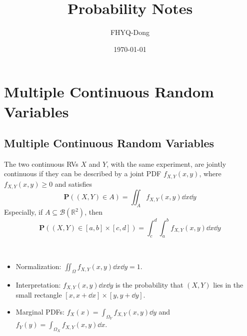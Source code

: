 \documentclass[device=normal, lang=en]{elegantbook}
\title{Probability Notes}
\author{FHYQ-Dong}
\date{\today}
\numberwithin{equation}{section}
\begin{document}
\maketitle
\frontmatter

\tableofcontents
\mainmatter











\chapter{Multiple Continuous Random Variables}


\section{Multiple Continuous Random Variables}

\begin{definition}
    The two continuous RVs $X$ and $Y$, with the same experiment, are jointly continuous if they can be described by a joint PDF $f_{X, Y}(x, y)$, where $f_{X, Y}(x, y) \geq 0$ and satisfies
    \begin{equation}
        \mathbf{P}((X, Y) \in A) = \iint_{A} f_{X, Y}(x, y) \dd{x} \dd{y}
    \end{equation}
    Especially, if $A \subseteq \mathcal{B}(\mathbb{R}^2)$, then
    \begin{equation}
        \mathbf{P}((X, Y) \in [a, b] \times [c, d]) = \int_{c}^{d} \int_{a}^{b} f_{X, Y}(x, y) \dd{x} \dd{y}
    \end{equation}
\end{definition}

\begin{property} ~
    \begin{itemize}
        \item Normalization: $\iint_{\Omega} f_{X, Y}(x, y) \dd{x} \dd{y} = 1$.
        \item Interpretation: $f_{X, Y}(x, y) \dd{x} \dd{y}$ is the probability that $(X, Y)$ lies in the small rectangle $[x, x + \dd{x}] \times [y, y + \dd{y}]$.
        \item Marginal PDFs: $f_{X}(x) = \int_{\Omega_{Y}} f_{X, Y}(x, y) \dd{y}$ and $f_{Y}(y) = \int_{\Omega_{X}} f_{X, Y}(x, y) \dd{x}$.
    \end{itemize}
\end{property}
\end{document}
